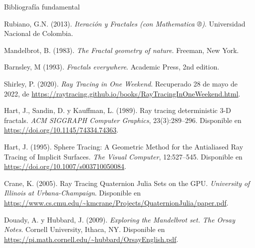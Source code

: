 \begin{frame}[allowframebreaks]{Bibliografía fundamental}

\begin{thebibliography}{99}

 Rubiano, G.N. (2013). \textit{Iteración y Fractales (con Mathematica ®)}. Universidad Nacional de Colombia.

 Mandelbrot, B. (1983). \textit{The Fractal geometry of nature}. Freeman, New York.

 Barnsley, M (1993). \textit{Fractals everywhere}. Academic Press, 2nd edition.

 Shirley, P. (2020). \textit{Ray Tracing in One Weekend}. Recuperado 28 de mayo de 2022, de \url{https://raytracing.github.io/books/RayTracingInOneWeekend.html}.

 Hart, J., Sandin, D. y Kauffman, L. (1989). Ray tracing deterministic 3-D fractals. \textit{ACM SIGGRAPH Computer Graphics}, 23(3):289--296. Disponible en \url{https://doi.org/10.1145/74334.74363}.

 Hart, J. (1995). Sphere Tracing: A Geometric Method for the Antialiased Ray Tracing of Implicit Surfaces. \textit{The Visual Computer}, 12:527--545. Disponible en \url{https://doi.org/10.1007/s003710050084}.

 Crane, K. (2005). Ray Tracing Quaternion Julia Sets on the GPU. \textit{University of Illinois at Urbana-Champaign}. Disponible en \url{https://www.cs.cmu.edu/~kmcrane/Projects/QuaternionJulia/paper.pdf}.

 Douady, A. y Hubbard, J. (2009). \textit{Exploring the Mandelbrot set. The Orsay Notes}. Cornell University, Ithaca, NY. Disponible en \url{https://pi.math.cornell.edu/~hubbard/OrsayEnglish.pdf}.


\end{thebibliography}

\end{frame}

